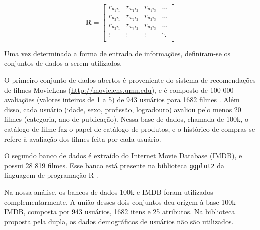 \begin{equation}
	  \mathbf{R} = 
\begin{bmatrix} 
  r_{u_1 i_1} &  r_{u_1 i_2} &  r_{u_1 i_3}  & \dots   \\
 r_{u_2 i_1} &  r_{u_2 i_2} &  r_{u_2 i_3}  & \dots   \\
 r_{u_3 i_1} &  r_{u_3 i_2} &  r_{u_3 i_3}  & \dots  \\ 
 \vdots &  \vdots &  \vdots  & \ddots   \\
\end{bmatrix}
\end{equation}




Uma vez determinada a forma de entrada de informações, definiram-se os conjuntos de dados a serem utilizados. 

O primeiro conjunto de dados abertos é proveniente do sistema de recomendações de filmes MovieLens (\url{http://movielens.umn.edu}), e é composto de 100 000 avaliações (valores inteiros de 1 a 5) de 943 usuários para 1682 filmes \cite{movielensdataset}. Além disso, cada usuário (idade, sexo, profissão, logradouro) avaliou pelo menos 20 filmes (categoria, ano de publicação). Nessa base de dados, chamada de 100k, o catálogo de filme faz o papel de catálogo de produtos, e o histórico de compras se refere à avaliação dos filmes feita por cada usuário. 

O segundo banco de dados é extraído do Internet Movie Database (IMDB), e possui 28 819 filmes. Esse banco está presente na biblioteca \texttt{ggplot2} da linguagem de programação R \cite{moviesggplot2dataset}.

Na nossa análise, os bancos de dados 100k e IMDB foram utilizados complementarmente. A união desses dois conjuntos deu origem à base 100k-IMDB, composta por 943 usuários, 1682 itens e 25 atributos. Na biblioteca proposta pela dupla, os dados demográficos de usuários não são utilizados. 


